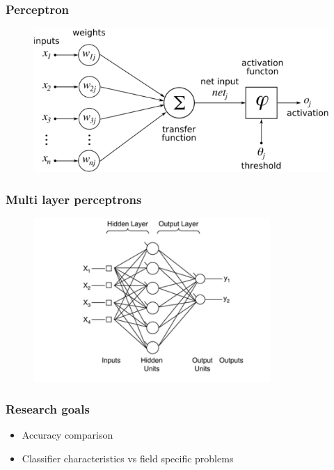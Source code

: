 \documentclass{beamer}
\begin{document}
\begin{frame} %
\frametitle{Perceptron}
\begin{figure}
	\centering
    \includegraphics[width=\textwidth]{./img/perceptron.png}
\end{figure}

\end{frame}
\begin{frame}
\frametitle{Multi layer perceptrons}
\begin{figure}
	\centering
    \includegraphics[width=90mm,scale=1]{./img/MLP.jpg}
\end{figure}
\end{frame}



\begin{frame}
\frametitle{Research goals}
\begin{itemize}
	\item Accuracy comparison
	\item Classifier characteristics vs field specific problems
	 
\end{itemize}
\end{frame}
\end{document}
